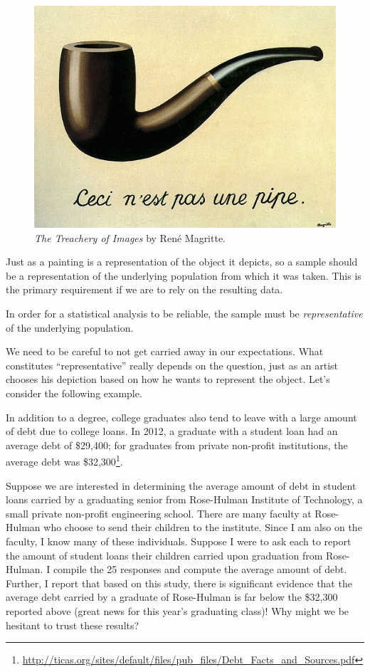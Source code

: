 \documentclass[]{book}
\let\rmarkdownfootnote\footnote%
\def\footnote{\protect\rmarkdownfootnote}
\theoremstyle{definition}
\theoremstyle{definition}
\theoremstyle{remark}
\let\BeginKnitrBlock\begin \let\EndKnitrBlock\end
\begin{document}
\begin{figure}

{\centering \includegraphics[width=0.8\linewidth]{./images/Data-Pipe} 

}

\caption{\emph{The Treachery of Images} by René
Magritte.}\label{fig:data-pipe-img}
\end{figure}

Just as a painting is a representation of the object it depicts, so a
sample should be a representation of the underlying population from
which it was taken. This is the primary requirement if we are to rely on
the resulting data.

\BeginKnitrBlock{rmdkeyidea}
In order for a statistical analysis to be reliable, the sample must be
\emph{representative} of the underlying population.
\EndKnitrBlock{rmdkeyidea}

We need to be careful to not get carried away in our expectations. What
constitutes ``representative'' really depends on the question, just as
an artist chooses his depiction based on how he wants to represent the
object. Let's consider the following example.

\BeginKnitrBlock{example}[School Debt]
\protect\hypertarget{ex:data-school-debt}{}{\label{ex:data-school-debt}
{} }In addition to a degree, college graduates
also tend to leave with a large amount of debt due to college loans. In
2012, a graduate with a student loan had an average debt of \$29,400;
for graduates from private non-profit institutions, the average debt was
\$32,300\footnote{\url{http://ticas.org/sites/default/files/pub_files/Debt_Facts_and_Sources.pdf}}.

Suppose we are interested in determining the average amount of debt in
student loans carried by a graduating senior from Rose-Hulman Institute
of Technology, a small private non-profit engineering school. There are
many faculty at Rose-Hulman who choose to send their children to the
institute. Since I am also on the faculty, I know many of these
individuals. Suppose I were to ask each to report the amount of student
loans their children carried upon graduation from Rose-Hulman. I compile
the 25 responses and compute the average amount of debt. Further, I
report that based on this study, there is significant evidence that the
average debt carried by a graduate of Rose-Hulman is far below the
\$32,300 reported above (great news for this year's graduating class)!
Why might we be hesitant to trust these results?
\EndKnitrBlock{example}
\end{document}
